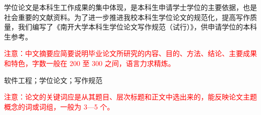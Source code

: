 
\begin{zhaiyao}
\begin{spacing}{1.5}
学位论文是本科生工作成果的集中体现，是本科生申请学士学位的主要依据，也是社会重要的文献资料。为了进一步推进我校本科生学位论文的规范化，提高写作质量，我们编写了《南开大学本科生学位论文写作规范（试行）》，供申请学位的本科生参考。

\textcolor{red}{注意：中文摘要应简要说明毕业论文所研究的内容、目的、方法、结论、主要成果和特色，字数一般在 200 至 300 之间，语言力求精炼。}
\end{spacing}

\vspace{\baselineskip}

\hspace*{2em}软件工程；学位论文；写作规范

\textcolor{red}{注意：论文的关键词应是从其题目、层次标题和正文中选出来的，能反映论文主题概念的词或词组，一般为 3—5 个。}
\end{zhaiyao}

\begin{abstract}
\begin{spacing}{1.5}
The dissertation is concentrated expression of undergraduate work, which is not only the main basis for undergraduate applicants for a bachelor's degree, but also a socially important document.

\textcolor{red}{Abstract 内容与中文摘要相对应。}

\textcolor{red}{注意：不要用“google 翻译”、“金山快译”、“有道翻译”等软件翻译后直接 copy，一定要认真修改，确保语法、句法没有问题，同时尽可能合乎英语常用语规范。}

（注明：字体要求：小四字号、Times New Roman）
\end{spacing}

\vspace{\baselineskip}

\hspace*{2em}Software Engineering; Dissertation; Writing specifications
\end{abstract}
